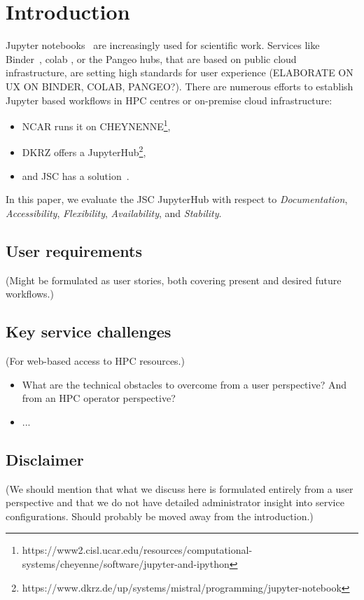 
\section{Introduction}
\label{s-introductoin}

Jupyter notebooks~\citep{Kluyver2016} are increasingly used for scientific work.
Services like Binder~\citep{Jupyter2018}, colab \citep{Google2020, Carneiro2018}, or the Pangeo hubs\citep{robinson2019science}, that are based on public cloud infrastructure, are setting high standards for user experience (ELABORATE ON UX ON BINDER, COLAB, PANGEO?).
There are numerous efforts to establish Jupyter based workflows in HPC centres or on-premise cloud infrastructure:
\begin{itemize}
  \item NCAR runs it on CHEYNENNE\footnote{https://www2.cisl.ucar.edu/resources/computational-systems/cheyenne/software/jupyter-and-ipython},
  \item DKRZ offers a JupyterHub\footnote{https://www.dkrz.de/up/systems/mistral/programming/jupyter-notebook},
  \item and JSC has a solution~\citep{Goebbert2018}.
\end{itemize}

In this paper, we evaluate the JSC JupyterHub with respect to {\em Documentation}, {\em Accessibility}, {\em Flexibility}, {\em Availability}, and {\em Stability}.

\subsection{User requirements}

(Might be formulated as user stories, both covering present and desired future workflows.)

\subsection{Key service challenges}

(For web-based access to HPC resources.)

\begin{itemize}
  \item What are the technical obstacles to overcome from a user perspective? And from an HPC operator perspective?
  \item ...
\end{itemize}

\subsection{Disclaimer}

(We should mention that what we discuss here is formulated entirely from a user perspective and that we do not have detailed administrator insight into service configurations. Should probably be moved away from the introduction.)
